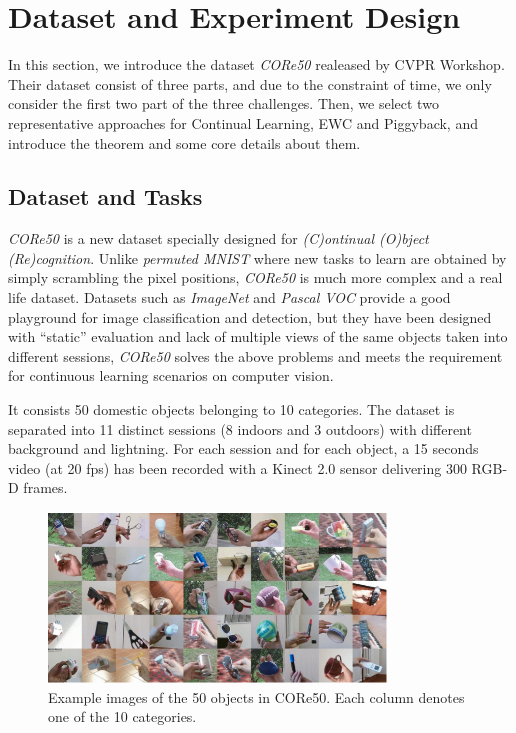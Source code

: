 \section{Dataset and Experiment Design} \label{design}
In this section, we introduce the dataset \textit{CORe50} realeased by CVPR Workshop. Their dataset consist of three parts, and due to the constraint of time, we only consider the first two part of the three challenges. Then, we select two representative approaches for Continual Learning, EWC and Piggyback, and introduce the theorem and some core details about them.

\subsection{Dataset and Tasks}
\textit{CORe50} is a new dataset specially designed for \textit{(C)ontinual (O)bject (Re)cognition}. Unlike \textit{permuted MNIST}  where new tasks to learn are obtained by simply scrambling the pixel positions, \textit{CORe50} is much more complex and a real life dataset. Datasets such as \textit{ImageNet} and \textit{Pascal VOC} provide a good playground for image classification and detection, but they have been designed with “static” evaluation and lack of multiple views of the same objects taken into different sessions, \textit{CORe50} solves the above problems and meets the requirement for continuous learning scenarios on computer vision.

It consists 50 domestic objects belonging to 10 categories. The dataset is separated into 11 distinct sessions (8 indoors and 3 outdoors) with different background and lightning. For each session and for each object, a 15 seconds video (at 20 fps) has been recorded with a Kinect 2.0 sensor delivering 300 RGB-D frames. 
\begin{figure}[h]
  \centering
  \captionsetup{width=0.6\textwidth}
  \includegraphics[width=0.8\textwidth]{figure/core50.png}
  \caption{Example images of the 50 objects in CORe50. Each column denotes one of the 10 categories.}
  \label{core50}
\end{figure}

